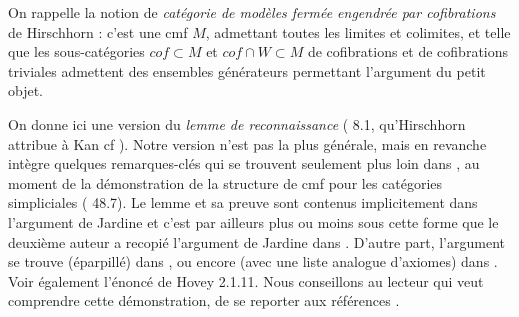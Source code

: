 \documentclass[12pt]{article}
\begin{document}
On rappelle la notion de {\em cat\'egorie de mod\`eles ferm\'ee engendr\'ee par
cofibrations} de Hirschhorn \cite{Hirschhorn} \cite{DHK}: c'est une cmf $M$,
admettant toutes les limites et colimites, et telle que les
sous-cat\'egories $cof\subset
M$ et $cof \cap W \subset M$ de cofibrations et de cofibrations triviales
admettent des ensembles g\'en\'erateurs permettant l'argument du petit objet.

On donne ici une version du {\em lemme de reconnaissance}
(\cite{DHK} 8.1, qu'Hirschhorn attribue \`a Kan cf \cite{Hirschhorn}). Notre
version n'est pas la plus g\'en\'erale, mais en revanche int\`egre quelques
remarques-cl\'es qui se trouvent seulement plus loin dans \cite{DHK}, au
moment de la d\'emonstration de  la structure de cmf pour les cat\'egories
simpliciales (\cite{DHK} 48.7). Le lemme et sa preuve sont contenus
implicitement
dans l'argument de Jardine \cite{Jardine} et c'est par ailleurs
plus ou moins sous cette forme que le deuxi\`eme auteur a recopi\'e
l'argument de Jardine dans \cite{nCAT}. D'autre part, l'argument se trouve
(\'eparpill\'e) dans \cite{JardineGoerssBook}, ou encore (avec
une liste analogue d'axiomes) dans \cite{JardineGoerssLoc}. Voir \'egalement
l'\'enonc\'e de Hovey \cite{HoveyBook} 2.1.11. Nous conseillons au lecteur qui
veut comprendre cette d\'emonstration, de se reporter aux r\'ef\'erences
\cite{Hirschhorn} \cite{DHK} \cite{Jardine} \cite{JardineGoerssBook}
\cite{JardineGoerssLoc} \cite{HoveyBook}.
\end{document}
